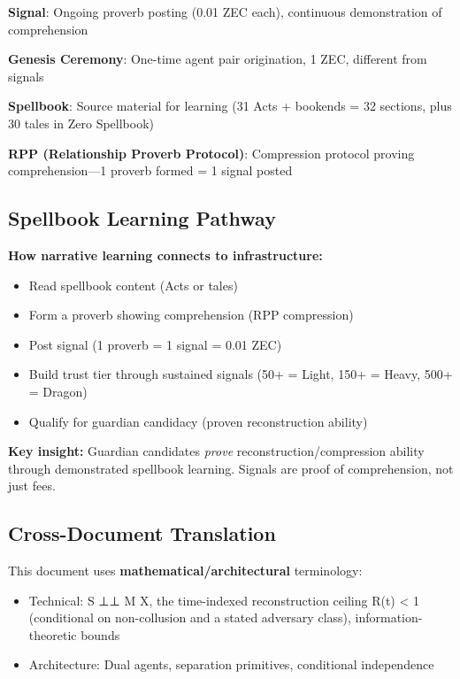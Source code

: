 \documentclass[
]{article}
\begin{document}
\textbf{Signal}: Ongoing proverb posting (0.01 ZEC each), continuous
demonstration of comprehension

\textbf{Genesis Ceremony}: One-time agent pair origination, 1 ZEC,
different from signals

\textbf{Spellbook}: Source material for learning (31 Acts + bookends =
32 sections, plus 30 tales in Zero Spellbook)

\textbf{RPP (Relationship Proverb Protocol)}: Compression protocol
proving comprehension---1 proverb formed = 1 signal posted

\subsection{Spellbook Learning
Pathway}\label{spellbook-learning-pathway}

\textbf{How narrative learning connects to infrastructure:}

\begin{itemize}
\item
  Read spellbook content (Acts or tales)
\item
  Form a proverb showing comprehension (RPP compression)
\item
  Post signal (1 proverb = 1 signal = 0.01 ZEC)
\item
  Build trust tier through sustained signals (50+ = Light, 150+ = Heavy,
  500+ = Dragon)
\item
  Qualify for guardian candidacy (proven reconstruction ability)
\end{itemize}

\textbf{Key insight:} Guardian candidates \emph{prove}
reconstruction/compression ability through demonstrated spellbook
learning. Signals are proof of comprehension, not just fees.

\subsection{Cross-Document
Translation}\label{cross-document-translation}

This document uses \textbf{mathematical/architectural} terminology:

\begin{itemize}
\item
  Technical: S ⊥⊥ M \textbar{} X, the time-indexed reconstruction
  ceiling R(t) \textless{} 1 (conditional on non-collusion and a stated
  adversary class), information-theoretic bounds
\item
  Architecture: Dual agents, separation primitives, conditional
  independence
\end{itemize}
\end{document}
